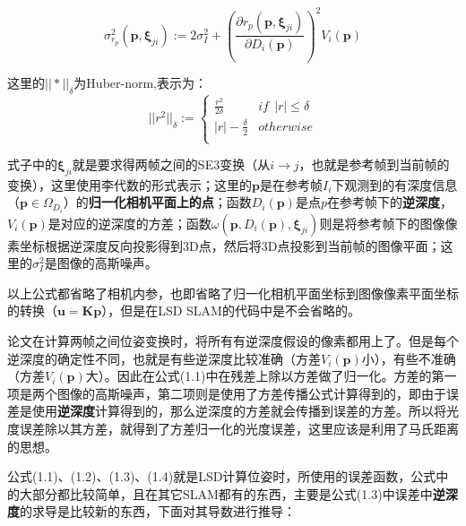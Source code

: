 \begin{equation}
	\sigma_{r_p}^{2}(\bm{p}, \bm{\xi}_{ji}) := 2\sigma_I^2 + (\frac{\partial r_p(\bm{p}, \bm{\xi}_{ji})}{\partial D_i(\bm{p})})^2V_i(\bm{p})
\end{equation}

这里的$||*||_\delta$为Huber-norm,表示为：
\begin{equation}
	||r^2||_\delta := 
		\begin{cases}
			\frac{r^2}{2\delta} &  if \ \ |r| \le \delta \\
			|r| - \frac{\delta}{2} & otherwise\\
		\end{cases}
\end{equation}

式子中的$\bm{\xi}_{ji}$就是要求得两帧之间的SE3变换（从$i \rightarrow j$，也就是参考帧到当前帧的变换），这里使用李代数的形式表示；这里的$\bm{p}$是在参考帧$I_i$下观测到的有深度信息（$\bm{p} \in \Omega_{D_i}$）的\textbf{归一化相机平面上的点}；函数$D_i(\bm{p})$是点$p$在参考帧下的\textbf{逆深度}，$V_i(\bm{p})$是对应的逆深度的方差；函数$\omega(\bm{p}, D_i(\bm{p}), \bm{\xi}_{ji})$则是将参考帧下的图像像素坐标根据逆深度反向投影得到3D点，然后将3D点投影到当前帧的图像平面；这里的$\sigma_I^2$是图像的高斯噪声。

\begin{note}
	以上公式都省略了相机内参，也即省略了归一化相机平面坐标到图像像素平面坐标的转换（$ \bm{u} = \bm{K}\bm{p}$），但是在LSD SLAM的代码中是不会省略的。
\end{note}


论文在计算两帧之间位姿变换时，将所有有逆深度假设的像素都用上了。但是每个逆深度的确定性不同，也就是有些逆深度比较准确（方差$V_i(\bm{p})$小），有些不准确（方差$V_i(\bm{p})$大）。因此在公式(1.1)中在残差上除以方差做了归一化。方差的第一项是两个图像的高斯噪声，第二项则是使用了方差传播公式计算得到的，即由于误差是使用\textbf{逆深度}计算得到的，那么逆深度的方差就会传播到误差的方差。所以将光度误差除以其方差，就得到了方差归一化的光度误差，这里应该是利用了马氏距离的思想。


公式(1.1)、(1.2)、(1.3)、(1.4)就是LSD计算位姿时，所使用的误差函数，公式中的大部分都比较简单，且在其它SLAM都有的东西，主要是公式(1.3)中误差中\textbf{逆深度}的求导是比较新的东西，下面对其导数进行推导：





